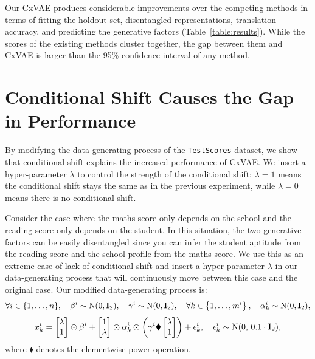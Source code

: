 \documentclass[../thesis.tex]{subfiles}
\begin{document}
Our CxVAE produces considerable improvements over the competing methods in terms of fitting the holdout set, disentangled representations, translation accuracy, and predicting the generative factors (Table~\ref{table:results}). While the scores of the existing methods cluster together, the gap between them and CxVAE is larger than the 95\% confidence interval of any method.

\section{Conditional Shift Causes the Gap in Performance}
\label{sec:xy}

By modifying the data-generating process of the \texttt{TestScores} dataset, we show that conditional shift explains the increased performance of CxVAE. We insert a hyper-parameter $\lambda$ to control the strength of the conditional shift; $\lambda=1$ means the conditional shift stays the same as in the previous experiment, while $\lambda=0$ means there is no conditional shift. 

Consider the case where the maths score only depends on the school and the reading score only depends on the student. In this situation, the two generative factors can be easily disentangled since you can infer the student aptitude from the reading score and the school profile from the maths score. We use this as an extreme case of lack of conditional shift and insert a hyper-parameter $\lambda$ in our data-generating process that will continuously move between this case and the original case. Our modified data-generating process is:
\[
      \forall i \in \{1,\dots,\mycnt{n}\}, \quad \beta^i \sim \mathrm{N}(0,\mymatrix{i}_2), \quad \gamma^i \sim \mathrm{N}(0,\mymatrix{i}_2), \quad \forall k \in \left\{1,\dots,\mycnt{m}^i\right\}, \quad \alpha^i_k \sim \mathrm{N}(0,\mymatrix{i}_2),
\]
\[
      \myvect{x}^{i}_k = \begin{bmatrix} \lambda \\ 1 \end{bmatrix} \odot \beta^i + \begin{bmatrix} 1 \\ \lambda \end{bmatrix} \odot \alpha^i_k \odot \left(\gamma^i \blacklozenge \begin{bmatrix} \lambda \\ 1 \end{bmatrix} \right) + \epsilon^i_k, \quad \epsilon^i_k \sim \mathrm{N}(0,\, 0.1 \cdot \mymatrix{i}_2),
\]
where $\blacklozenge$ denotes the elementwise power operation. 
\end{document}
